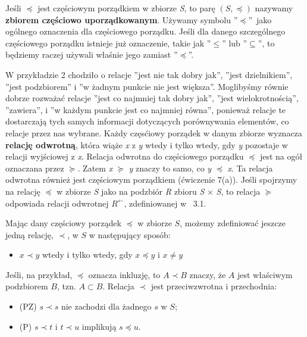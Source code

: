 \documentclass[14pt]{extarticle}
\begin{document}
\begin{changemargin}{160pt}{0pt}
\qquad Jeśli $\preceq$ jest częściowym porządkiem w zbiorze \textit{S}, to parę $(\textit{S}, \preceq)$ nazywamy \textbf{zbiorem częściowo uporządkowanym}. 
Używamy symbolu ''$\preceq$''~jako ogólnego oznaczenia dla częściowego porządku.
Jeśli dla danego szczególnego częściowego porządku istnieje już oznaczenie, takie jak ''$\le$'' lub ''$\subseteq$'', to będziemy raczej używali właśnie jego zamiast ''$\preceq$''.

\qquad W przykładzie 2 chodziło o relacje ''jest nie tak dobry jak'', ''jest dzielnikiem'', ''jest podzbiorem'' i ''w żadnym punkcie nie jest większa''. Moglibyśmy równie dobrze rozważać relacje ''jest co najmniej tak dobry jak'', ''jest wielokrotnością'', ''zawiera'', i ''w każdym punkcie jest co najmniej równa'', ponieważ relacje te dostarczają tych samych informacji dotyczących porównywania elementów, co relacje przez nas wybrane. Każdy częsćiowy porządek w danym zbiorze wyznacza \textbf{relację odwrotną}, która wiąże \textit{x} z \textit{y} wtedy i tylko wtedy, gdy \textit{y} pozostaje w relacji wyjściowej z \textit{x}. Relacja odwrotna do częściowego porządku $\preceq$ jest na ogół oznaczana przez $\succeq$. Zatem \textit{x} $\succeq$ \textit{y} znaczy to samo, co \textit{y} $\preceq$ \textit{x}. Ta relacja odwrotna również jest częściowym porządkiem (ćwiczenie 7(a)). Jeśli spojrzymy na relację $\preceq$ w zbiorze \textit{S} jako na podzbiór \textit{R} zbioru \textit{S} $\times$ \textit{S}, to relacja $\succeq$
odpowiada relacji odwrotnej $\mathit{R^\gets}$, zdefiniowanej w \textsection ~3.1.

\qquad Mając dany częściowy porządek $\preceq$ w zbiorze $\textit{S}$, możemy zdefiniować jeszcze jedną relację, $\prec$, w $\mathit{S}$ w następujący sposób:

\begin{itemize}
\item[] $\mathit{x} \prec \mathit{y}$ wtedy i tylko wtedy, gdy $\mathit{x} \preceq \mathit{y}$ i $\mathit{x} \ne \mathit{y}$
\end{itemize}

Jeśli, na przykład, $\preceq$ oznacza inkluzję, to $\mathit{A} \prec \mathit{B}$ znaczy, że $\mathit{A}$ jest właściwym podzbiorem $\mathit{B}$, tzn. $\mathit{A} \subset \mathit{B}$. Relacja $\prec$ jest przeciwzwrotna i przechodnia:

\begin{itemize}
    \item[] (PZ) $\mathit{s} \prec \mathit{s}$ nie zachodzi dla żadnego $\mathit{s}$ w $\mathit{S}$;
    \item[] (P) $\mathit{s} \prec \mathit{t}$ i $\mathit{t} \prec \mathit{u}$ implikują $\mathit{s} \preceq \mathit{u}$.
\end{itemize}


\end{changemargin}
\end{document}
